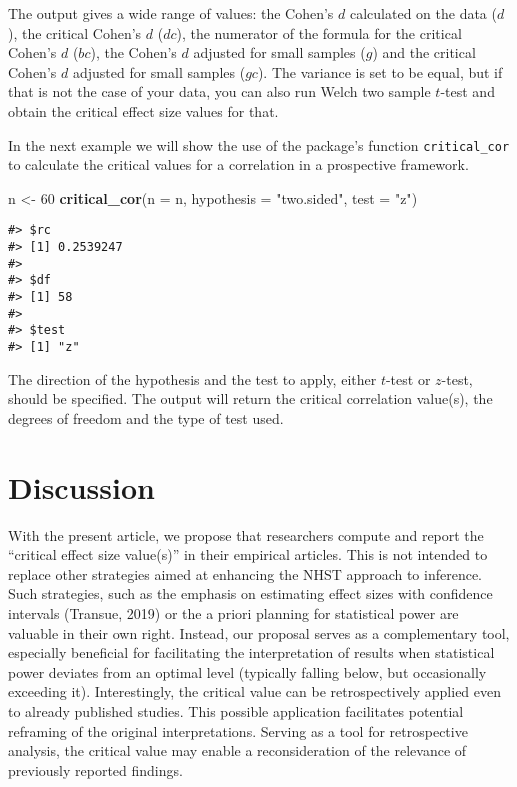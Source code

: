 \documentclass[
  man]{apa7}
\newenvironment{Shaded}{\begin{snugshade}}{\end{snugshade}}
\newcommand{\AttributeTok}[1]{\textcolor[rgb]{0.13,0.29,0.53}{#1}}
\newcommand{\DecValTok}[1]{\textcolor[rgb]{0.00,0.00,0.81}{#1}}
\newcommand{\FunctionTok}[1]{\textcolor[rgb]{0.13,0.29,0.53}{\textbf{#1}}}
\newcommand{\NormalTok}[1]{#1}
\newcommand{\OtherTok}[1]{\textcolor[rgb]{0.56,0.35,0.01}{#1}}
\newcommand{\StringTok}[1]{\textcolor[rgb]{0.31,0.60,0.02}{#1}}
\begin{document}
The output gives a wide range of values: the Cohen's \(d\) calculated on the data (\(d\)), the critical Cohen's \(d\) (\(dc\)), the numerator of the formula for the critical Cohen's \(d\) (\(bc\)), the Cohen's \(d\) adjusted for small samples (\(g\)) and the critical Cohen's \(d\) adjusted for small samples (\(gc\)). The variance is set to be equal, but if that is not the case of your data, you can also run Welch two sample \(t\)-test and obtain the critical effect size values for that.

In the next example we will show the use of the package's function \texttt{critical\_cor} to calculate the critical values for a correlation in a prospective framework.

\begin{Shaded}
\begin{Highlighting}[]
\NormalTok{n }\OtherTok{\textless{}{-}} \DecValTok{60}
\FunctionTok{critical\_cor}\NormalTok{(}\AttributeTok{n =}\NormalTok{ n, }\AttributeTok{hypothesis =} \StringTok{"two.sided"}\NormalTok{, }\AttributeTok{test =} \StringTok{"z"}\NormalTok{)}
\end{Highlighting}
\end{Shaded}

\begin{verbatim}
#> $rc
#> [1] 0.2539247
#> 
#> $df
#> [1] 58
#> 
#> $test
#> [1] "z"
\end{verbatim}

The direction of the hypothesis and the test to apply, either \(t\)-test or \(z\)-test, should be specified. The output will return the critical correlation value(s), the degrees of freedom and the type of test used.

\hypertarget{discussion}{%
\section{Discussion}\label{discussion}}

With the present article, we propose that researchers compute and report the ``critical effect size value(s)'' in their empirical articles. This is not intended to replace other strategies aimed at enhancing the NHST approach to inference. Such strategies, such as the emphasis on estimating effect sizes with confidence intervals (Transue, 2019) or the a priori planning for statistical power are valuable in their own right. Instead, our proposal serves as a complementary tool, especially beneficial for facilitating the interpretation of results when statistical power deviates from an optimal level (typically falling below, but occasionally exceeding it). Interestingly, the critical value can be retrospectively applied even to already published studies. This possible application facilitates potential reframing of the original interpretations. Serving as a tool for retrospective analysis, the critical value may enable a reconsideration of the relevance of previously reported findings.
\end{document}
